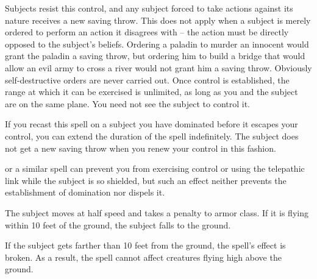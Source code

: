 \begin{spelleffect}
  \par Subjects resist this control, and any subject forced to take actions against its nature receives a new saving throw. This does not apply when a subject is merely ordered to perform an action it disagrees with -- the action must be directly opposed to the subject's beliefs. Ordering a paladin to murder an innocent would grant the paladin a saving throw, but ordering him to build a bridge that would allow an evil army to cross a river would not grant him a saving throw. Obviously self-destructive orders are never carried out. Once control is established, the range at which it can be exercised is unlimited, as long as you and the subject are on the same plane. You need not see the subject to control it.
  \par If you recast this spell on a subject you have dominated before it escapes your control, you can extend the duration of the spell indefinitely. The subject does not get a new saving throw when you renew your control in this fashion.
\end{spelleffect}
\begin{spellnotes}
   or a similar spell can prevent you from exercising control or using the telepathic link while the subject is so shielded, but such an effect neither prevents the establishment of domination nor dispels it.
\end{spellnotes}

\begin{comment}
\subsubsection{E}
\end{comment}

\spellrng{\rngmed}
\spelldur{\durshort}
\begin{spelleffect}
  The subject moves at half speed and takes a  penalty to armor class. If it is flying within 10 feet of the ground, the subject falls to the ground.
\end{spelleffect}
\begin{spellnotes}
  If the subject gets farther than 10 feet from the ground, the spell's effect is broken. As a result, the spell cannot affect creatures flying high above the ground.
\end{spellnotes}

